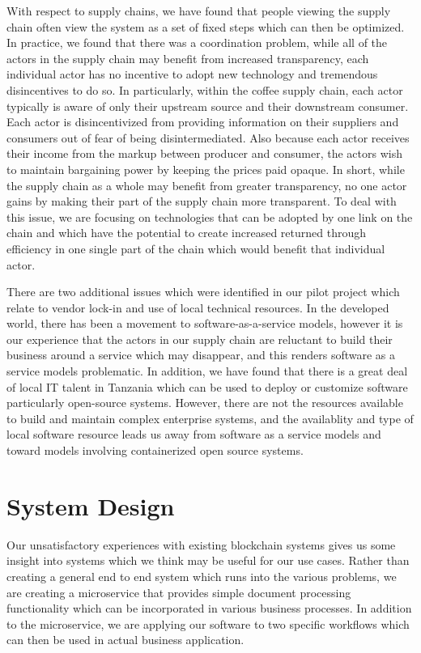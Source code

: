 \documentclass[journal]{IEEEtran}
\begin{document}
With respect to supply chains, we have found that people viewing the
supply chain often view the system as a set of fixed steps which can
then be optimized.  In practice, we found that there was a
coordination problem, while all of the actors in the supply chain may
benefit from increased transparency, each individual actor has no
incentive to adopt new technology and tremendous disincentives to do
so.  In particularly, within the coffee supply chain, each actor
typically is aware of only their upstream source and their downstream
consumer.  Each actor is disincentivized from providing information on
their suppliers and consumers out of fear of being disintermediated.
Also because each actor receives their income from the markup between
producer and consumer, the actors wish to maintain bargaining power by
keeping the prices paid opaque.  In short, while the supply chain as a
whole may benefit from greater transparency, no one actor gains by
making their part of the supply chain more transparent.  To deal with
this issue, we are focusing on technologies that can be adopted by one
link on the chain and which have the potential to create increased
returned through efficiency in one single part of the chain which
would benefit that individual actor.

There are two additional issues which were identified in our pilot
project which relate to vendor lock-in and use of local technical
resources.  In the developed world, there has been a movement to
software-as-a-service models, however it is our experience that the
actors in our supply chain are reluctant to build their business
around a service which may disappear, and this renders software as a
service models problematic.  In addition, we have found that there is
a great deal of local IT talent in Tanzania which can be used to
deploy or customize software particularly open-source systems.
However, there are not the resources available to build and maintain
complex enterprise systems, and the availablity and type of local
software resource leads us away from software as a service models and
toward models involving containerized open source systems.

\section{System Design}

Our unsatisfactory experiences with existing blockchain systems gives
us some insight into systems which we think may be useful for our use
cases.  Rather than creating a general end to end system which runs
into the various problems, we are creating a microservice that
provides simple document processing functionality which can be
incorporated in various business processes.  In addition to the
microservice, we are applying our software to two specific workflows
which can then be used in actual business application.
\end{document}
